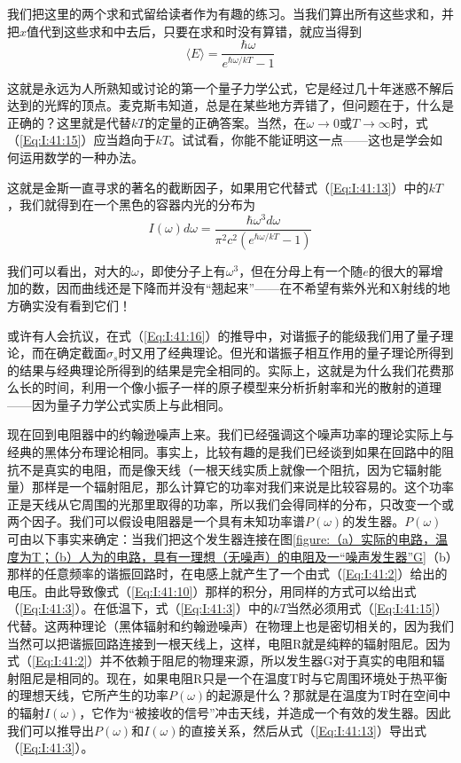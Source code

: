 我们把这里的两个求和式留给读者作为有趣的练习。当我们算出所有这些求和，并把$x$值代到这些求和中去后，只要在求和时没有算错，就应当得到
\begin{equation}
    \label{Eq:I:41:15}
    \langle E \rangle = \frac{\hbar\omega}{e^{\hbar\omega/kT} - 1}
\end{equation}

这就是永远为人所熟知或讨论的第一个量子力学公式，它是经过几十年迷惑不解后达到的光辉的顶点。麦克斯韦知道，总是在某些地方弄错了，但问题在于，什么是正确的？这里就是代替$kT$的定量的正确答案。当然，在$\omega \to 0$或$T \to \infty$时，式（\ref{Eq:I:41:15}）应当趋向于$kT$。试试看，你能不能证明这一点——这也是学会如何运用数学的一种办法。

这就是金斯一直寻求的著名的截断因子，如果用它代替式（\ref{Eq:I:41:13}）中的$kT$，我们就得到在一个黑色的容器内光的分布为
\begin{equation}
    \label{Eq:I:41:16}
    I(\omega)d\omega = \frac{\hbar\omega^3d\omega}{\pi^2c^2(e^{\hbar\omega/kT} - 1)}
\end{equation}

我们可以看出，对大的$\omega$，即使分子上有$\omega^3$，但在分母上有一个随$e$的很大的幂增加的数，因而曲线还是下降而并没有“翘起来”——在不希望有紫外光和X射线的地方确实没有看到它们！

或许有人会抗议，在式（\ref{Eq:I:41:16}）的推导中，对谐振子的能级我们用了量子理论，而在确定截面$\sigma_s$时又用了经典理论。但光和谐振子相互作用的量子理论所得到的结果与经典理论所得到的结果是完全相同的。实际上，这就是为什么我们花费那么长的时间，利用一个像小振子一样的原子模型来分析折射率和光的散射的道理——因为量子力学公式实质上与此相同。

现在回到电阻器中的约翰逊噪声上来。我们已经强调这个噪声功率的理论实际上与经典的黑体分布理论相同。事实上，比较有趣的是我们已经谈到如果在回路中的阻抗不是真实的电阻，而是像天线（一根天线实质上就像一个阻抗，因为它辐射能量）那样是一个辐射阻尼，那么计算它的功率对我们来说是比较容易的。这个功率正是天线从它周围的光那里取得的功率，所以我们会得同样的分布，只改变一个或两个因子。我们可以假设电阻器是一个具有未知功率谱$P(\omega)$的发生器。$P(\omega)$可由以下事实来确定：当我们把这个发生器连接在图\ref{figure:（a）实际的电路，温度为T；（b）人为的电路，具有一理想（无噪声）的电阻及一“噪声发生器”G}（b）那样的任意频率的谐振回路时，在电感上就产生了一个由式（\ref{Eq:I:41:2}）给出的电压。由此导致像式（\ref{Eq:I:41:10}）那样的积分，用同样的方式可以给出式（\ref{Eq:I:41:3}）。在低温下，式（\ref{Eq:I:41:3}）中的$kT$当然必须用式（\ref{Eq:I:41:15}）代替。这两种理论（黑体辐射和约翰逊噪声）在物理上也是密切相关的，因为我们当然可以把谐振回路连接到一根天线上，这样，电阻R就是纯粹的辐射阻尼。因为式（\ref{Eq:I:41:2}）并不依赖于阻尼的物理来源，所以发生器G对于真实的电阻和辐射阻尼是相同的。现在，如果电阻R只是一个在温度T时与它周围环境处于热平衡的理想天线，它所产生的功率$P(\omega)$的起源是什么？那就是在温度为T时在空间中的辐射$I(\omega)$，它作为“被接收的信号”冲击天线，并造成一个有效的发生器。因此我们可以推导出$P(\omega)$和$I(\omega)$的直接关系，然后从式（\ref{Eq:I:41:13}）导出式（\ref{Eq:I:41:3}）。


